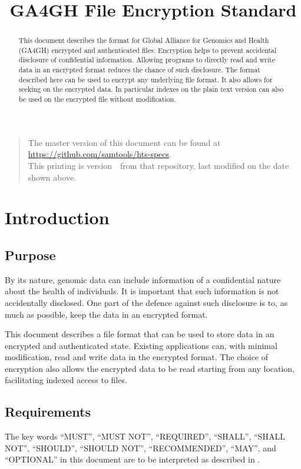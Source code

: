 \documentclass[10pt]{article}
\begin{document}

\title{GA4GH File Encryption Standard}
\date{\headdate}
\maketitle
\begin{quote}\small
The master version of this document can be found at
\url{https://github.com/samtools/hts-specs}.\\
This printing is version~\commitdesc\ from that repository,
last modified on the date shown above.
\end{quote}
\vspace*{1em}

\begin{abstract}
This document describes the format for Global Alliance for Genomics and Health (GA4GH) encrypted and authenticated
files.
Encryption helps to prevent accidental disclosure of confidential information.
Allowing programs to directly read and write data in an encrypted format reduces the chance of such disclosure.
The format described here can be used to encrypt any underlying file format.
It also allows for seeking on the encrypted data.
In particular indexes on the plain text version can also be used on the encrypted file without modification.
\end{abstract}
\newpage
\tableofcontents
\newpage
\section{Introduction}
\subsection{Purpose}
By its nature, genomic data can include information of a confidential nature about the health of individuals.
It is important that such information is not accidentally disclosed.
One part of the defence against such disclosure is to, as much as possible, keep the data in an encrypted format.

This document describes a file format that can be used to store data in an encrypted and authenticated state.
Existing applications can, with minimal modification, read and write data in the encrypted format.
The choice of encryption also allows the encrypted data to be read starting from any location, facilitating indexed
access to files.

\subsection{Requirements}
The key words ``MUST'', ``MUST NOT'', ``REQUIRED'', ``SHALL'', ``SHALL NOT'', ``SHOULD'', ``SHOULD NOT'',
``RECOMMENDED'', ``MAY'', and ``OPTIONAL'' in this document are to be interpreted as described in \cite{RFC2119}.
\end{document}
